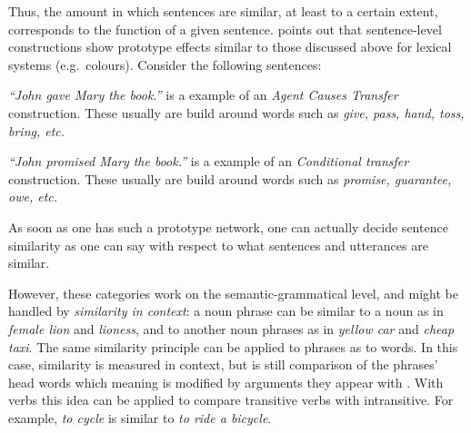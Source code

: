 \documentclass[11pt]{article}
\begin{document}
Thus, the amount in which sentences are similar, at least to a certain extent, corresponds to the function of a given sentence.  points out that sentence-level constructions show prototype effects similar to those discussed above for lexical systems (e.g.~colours). Consider the following sentences:
\begin{compactitem}
    \item \textit{``John gave Mary the book.''} is a example of an \emph{Agent Causes Transfer} construction. These usually are build around words such as \textit{give, pass, hand, toss, bring, etc.}
      \item \textit{``John promised Mary the book.''} is a example of an \emph{Conditional transfer} construction. These usually are build around words such as \textit{promise, guarantee, owe, etc.}
\end{compactitem}

As soon as one has such a prototype network, one can actually decide sentence similarity as one can say with respect to what sentences and utterances are similar. 

However, these categories work on the semantic-grammatical level, and might be handled by \emph{similarity in context}: a noun phrase can be similar to a noun as in \textit{female lion} and \textit{lioness}, and to another noun phrases as in \textit{yellow car} and \textit{cheap taxi}. The same similarity principle can be applied to phrases as to words. In this case, similarity is measured in context, but is still comparison of the phrases' head words which meaning is modified by arguments they appear with \cite{Kintsch2001173,mitchell-lapata:2008:ACLMain,mitchell2010composition,Dinu:2010:MDS:1870658.1870771,Baroni2010nouns,thater-furstenau-pinkal:2011:IJCNLP-2011,Seaghdha:2011:PMS:2145432.2145545}. With verbs this idea can be applied to compare transitive verbs with intransitive. For example, \textit{to cycle} is similar to \textit{to ride a bicycle}.
\end{document}
